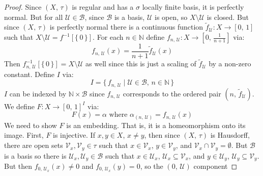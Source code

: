\documentclass{article}
\theoremstyle{plain}
\theoremstyle{normal}
\begin{document}
        \begin{proof}
            Since $(X,\,\tau)$ is regular and has a $\sigma$ locally finite
            basis, it is perfectly normal. But for all
            $\mathcal{U}\in\mathcal{B}$, since $\mathcal{B}$ is a basis,
            $\mathcal{U}$ is open, so $X\setminus\mathcal{U}$ is closed.
            But since $(X,\,\tau)$ is perfectly normal there is a
            continuous function
            $\tilde{f}_{\mathcal{U}}:X\rightarrow[0,\,1]$ such that
            $X\setminus\mathcal{U}=f^{-1}[\{\,0\,\}]$. For each $n\in\mathbb{N}$
            define $f_{n,\,\mathcal{U}}:X\rightarrow[0,\,\frac{1}{n+1}]$ via:
            \begin{equation}
                f_{n,\,\mathcal{U}}(x)=\frac{1}{n+1}\tilde{f}_{\mathcal{U}}(x)
            \end{equation}
            Then $f_{n,\,\mathcal{U}}^{-1}[\{\,0\,\}]=X\setminus\mathcal{U}$
            as well since this is just a scaling of $\tilde{f}_{\mathcal{U}}$ by
            a non-zero constant. Define $I$ via:
            \begin{equation}
                I=\{\,f_{n,\,\mathcal{U}}\;|\;
                    \mathcal{U}\in\mathcal{B},\,n\in\mathbb{N}\,\}
            \end{equation}
            $I$ can be indexed by $\mathbb{N}\times\mathcal{B}$ since
            $f_{n,\,\mathcal{U}}$ corresponds to the ordered pair
            $(n,\,\tilde{f}_{\mathcal{U}})$. We define
            $F:X\rightarrow[0,\,1]^{I}$ via:
            \begin{equation}
                F(x)=\alpha\textrm{ where }\alpha_{(n,\,\mathcal{U})}=
                    f_{n,\,\mathcal{U}}(x)
            \end{equation}
            We need to show $F$ is an embedding. That is, it is a homeomorphism
            onto its image. First, $F$ is injective. If
            $x,y\in{X}$, $x\ne{y}$, then since $(X,\,\tau)$ is Hausdorff,
            there are open sets $\mathcal{V}_{x},\mathcal{V}_{y}\in\tau$ such
            that $x\in\mathcal{V}_{x}$, $y\in\mathcal{V}_{y}$, and
            $\mathcal{V}_{x}\cap\mathcal{V}_{y}=\emptyset$. But $\mathcal{B}$
            is a basis so there is
            $\mathcal{U}_{x},\mathcal{U}_{y}\in\mathcal{B}$ such that
            $x\in\mathcal{U}_{x}$, $\mathcal{U}_{x}\subseteq\mathcal{V}_{x}$,
            and $y\in\mathcal{U}_{y}$,
            $\mathcal{U}_{y}\subseteq\mathcal{V}_{y}$. But then
            $f_{0,\,\mathcal{U}_{x}}(x)\ne{0}$ and
            $f_{0,\,\mathcal{U}_{x}}(y)=0$, so the $(0,\,\mathcal{U})$ component

\end{proof}
\end{document}
